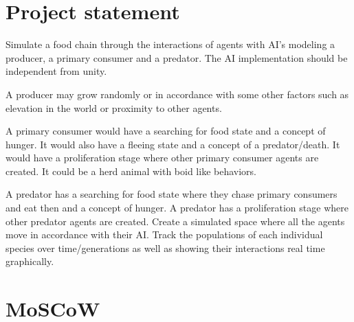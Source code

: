 \documentclass[a4paper, oneside, 11pt]{report}
\begin{document}
\section{Project statement}
Simulate a food chain through the interactions of agents with AI’s modeling a producer, a primary consumer and a predator. The AI implementation should be independent from unity.  

A producer may grow randomly or in accordance with some other factors such as elevation in the world or proximity to other agents. 

A primary consumer would have a searching for food state and a concept of hunger. It would also have a fleeing state and a concept of a predator/death. It would have a proliferation stage where other primary consumer agents are created. It could be a herd animal with boid like behaviors. 

A predator has a searching for food state where they chase primary consumers and eat then and a concept of hunger. A predator has a proliferation stage where other predator agents are created. Create a simulated space where all the agents move in accordance with their AI. Track the populations of each individual species over time/generations as well as showing their interactions real time graphically. 

\section{MoSCoW}
\end{document}
